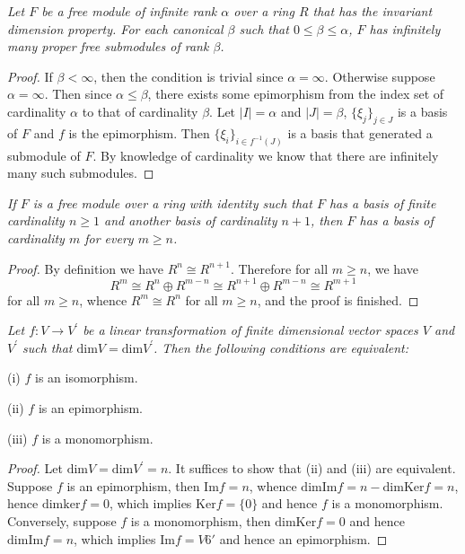 \begin{problem}\em
Let $F$ be a free module of infinite rank $\alpha$ over a ring $R$ that has the invariant dimension property. For each canonical $\beta$ such that $0\le\beta\le\alpha$, $F$ has infinitely many proper free submodules of rank $\beta$.
\end{problem}
\begin{proof}
If $\beta<\infty$, then the condition is trivial since $\alpha=\infty$. Otherwise suppose $\alpha=\infty$. Then since $\alpha\le\beta$, there exists some epimorphism from the index set of cardinality $\alpha$ to that of cardinality $\beta$. Let $|I|=\alpha$ and $|J|=\beta$, $\{\xi_j\}_{j\in J}$ is a basis of $F$ and $f$ is the epimorphism. Then $\{\xi_i\}_{i\in f^{-1}(J)}$ is a basis that generated a submodule of $F$. By knowledge of cardinality we know that there are infinitely many such submodules.
\end{proof}
\begin{problem}\em
If $F$ is a free module over a ring with identity such that $F$ has a basis of finite cardinality $n\ge 1$ and another basis of cardinality $n+1$, then $F$ has a basis of cardinality $m$ for every $m\ge n$.
\end{problem}
\begin{proof}
By definition we have $R^n\cong R^{n+1}$. Therefore for all $m\ge n$, we have 
$$
R^m\cong R^n\oplus R^{m-n}\cong R^{n+1}\oplus R^{m-n}\cong R^{m+1}
$$
for all $m\ge n$, whence $R^m\cong R^n$ for all $m\ge n$, and the proof is finished.
\end{proof}
\begin{problem}\em
Let $f:V\to V^\prime$ be a linear transformation of finite dimensional vector spaces $V$ and $V^\prime$ such that $\mathrm{dim}V=\mathrm{dim}V^\prime$. Then the following conditions are equivalent:\par
(i) $f$ is an isomorphism.\par
(ii) $f$ is an epimorphism.\par
(iii) $f$ is a monomorphism.
\end{problem}
\begin{proof}
Let $\mathrm{dim}V=\mathrm{dim}V^\prime=n$. It suffices to show that (ii) and (iii) are equivalent. Suppose $f$ is an epimorphism, then $\mathrm{Im}f=n$, whence $\mathrm{dim}\mathrm{Im}f=n-\mathrm{dim}\mathrm{Ker}f=n$, hence $\mathrm{dim}\mathrm{ker}f=0$, which implies $\mathrm{Ker}f=\{0\}$ and hence $f$ is a monomorphism. Conversely, suppose $f$ is a monomorphism, then $\mathrm{dim}\mathrm{Ker}f=0$ and hence $\mathrm{dim}\mathrm{Im}f=n$, which implies $\mathrm{Im}f=V6\prime$ and hence an epimorphism.
\end{proof}
